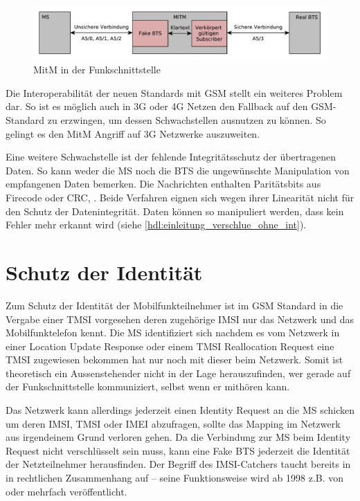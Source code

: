 \begin{figure}[H]
	\centering \includegraphics[width=0.9\linewidth]{figures/mitm_air_interface.pdf}
	\caption[MitM in Funkschnittstelle]{\ac{MitM} in der Funkschnittstelle} \label{fig:mitm-air-interface}
\end{figure}

Die Interoperabilität der neuen Standards mit \ac{GSM} stellt ein weiteres Problem dar. So ist es möglich auch in 3G oder 4G Netzen den Fallback auf den \ac{GSM}-Standard zu erzwingen, um dessen Schwachstellen ausnutzen zu können. So gelingt es \citet{meyer2004man} \citet{perez2011practical} den \ac{MitM} Angriff auf 3G Netzwerke auszuweiten.

Eine weitere Schwachstelle ist der fehlende Integritätsschutz der übertragenen Daten. So kann weder die \ac{MS} noch die \ac{BTS} die ungewünschte Manipulation von empfangenen Daten bemerken. Die Nachrichten enthalten Paritätsbits aus Firecode oder \ac{CRC}, . Beide Verfahren eignen sich wegen ihrer Linearität nicht für den Schutz der Datenintegrität. Daten können so manipuliert werden, dass kein Fehler mehr erkannt wird (siehe \autoref{hdl:einleitung_verschlue_ohne_int}). 

\section{Schutz der Identität}

Zum Schutz der Identität der Mobilfunkteilnehmer ist im \ac{GSM} Standard in  die Vergabe einer \ac{TMSI} vorgesehen deren zugehörige \ac{IMSI} nur das Netzwerk und das Mobilfunktelefon kennt. Die \ac{MS} identifiziert sich nachdem es vom Netzwerk in einer Location Update Response oder einem \ac{TMSI} Reallocation Request eine \ac{TMSI} zugewiesen bekommen hat nur noch mit dieser beim Netzwerk. Somit ist theoretisch ein Aussenstehender nicht in der Lage herauszufinden, wer gerade auf der Funkschnittstelle kommuniziert, selbst wenn er mithören kann.

Das Netzwerk kann allerdings jederzeit einen Identity Request an die \ac{MS} schicken um deren \ac{IMSI}, \ac{TMSI} oder \ac{IMEI} abzufragen, sollte das Mapping im Netzwerk aus irgendeinem Grund verloren gehen. Da die Verbindung zur \ac{MS} beim Identity Request nicht verschlüsselt sein muss, kann eine Fake \ac{BTS} jederzeit die Identität der Netzteilnehmer herausfinden. Der Begriff des \ac{IMSI}-Catchers taucht bereits in \citet{gobel1996strafprozess} in rechtlichen Zusammenhang auf -- seine Funktionsweise wird ab 1998 z.B. von \citet{piper1998cryptographic} oder \citet{fox2002imsi} mehrfach veröffentlicht.


